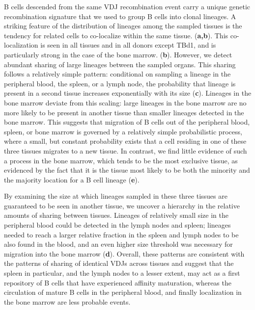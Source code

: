 \noindent B cells descended from the same VDJ recombination event carry a unique genetic recombination signature that we used to group B cells into clonal lineages. A striking feature of the distribution of lineages among the sampled tissues is the tendency for related cells to co-localize within the same tissue. (\textbf{a,b}). This co-localization is seen in all tissues and in all donors except TBd1, and is particularly strong in the case of the bone marrow. (\textbf{b}).  However, we detect abundant sharing of large lineages between the sampled organs. This sharing follows a relatively simple pattern: conditional on sampling a lineage in the peripheral blood, the spleen, or a lymph node, the probability that lineage is present in a second tissue increases exponentially with its size (\textbf{c}). Lineages in the bone marrow deviate from this scaling: large lineages in the bone marrow are no more likely to be present in another tissue than smaller lineages detected in the bone marrow. This suggests that migration of B cells out of the peripheral blood, spleen, or bone marrow is governed by a relatively simple probabilistic process, where a small, but constant probability exists that a cell residing in one of these three tissues migrates to a new tissue. In contrast, we find little evidence of such a process in the bone marrow, which tends to be the most exclusive tissue, as evidenced by the fact that it is the tissue most likely to be both the minority and the majority location for a B cell lineage (\textbf{e}).

By examining the size at which lineages sampled in these three tissues are guaranteed to be seen in another tissue, we uncover a hierarchy in the relative amounts of sharing between tissues. Lineages of relatively small size in the peripheral blood could be detected in the lymph nodes and spleen; lineages needed to reach a larger relative fraction in the spleen and lymph nodes to be also found in the blood, and an even higher size threshold was necessary for migration into the bone marrow (\textbf{d}). Overall, these patterns are consistent with the patterns of sharing of identical VDJs across tissues and suggest that the spleen in particular, and the lymph nodes to a lesser extent, may act as a first repository of B cells that have experienced affinity maturation, whereas the circulation of mature B cells in the peripheral blood, and finally localization in the bone marrow are less probable events.

